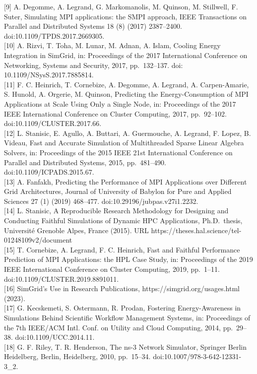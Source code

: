 \documentclass[
]{article}
\begin{document}
{[}9{]} A. Degomme, A. Legrand, G. Markomanolis, M. Quinson, M.
Stillwell, F. Suter, Simulating MPI applications: the SMPI approach,
IEEE Transactions on Parallel and Distributed Systems 18 (8) (2017)
2387--2400. doi:10.1109/TPDS.2017.2669305.\\
{[}10{]} A. Rizvi, T. Toha, M. Lunar, M. Adnan, A. Islam, Cooling Energy
Integration in SimGrid, in: Proceedings of the 2017 International
Conference on Networking, Systems and Security, 2017, pp.~132--137. doi:
10.1109/NSysS.2017.7885814.\\
{[}11{]} F. C. Heinrich, T. Cornebize, A. Degomme, A. Legrand, A.
Carpen-Amarie, S. Hunold, A. Orgerie, M. Quinson, Predicting the
Energy-Consumption of MPI Applications at Scale Using Only a Single
Node, in: Proceedings of the 2017 IEEE International Conference on
Cluster Computing, 2017, pp.~92--102. doi:10.1109/CLUSTER.2017.66.\\
{[}12{]} L. Stanisic, E. Agullo, A. Buttari, A. Guermouche, A. Legrand,
F. Lopez, B. Videau, Fast and Accurate Simulation of Multithreaded
Sparse Linear Algebra Solvers, in: Proceedings of the 2015 IEEE 21st
International Conference on Parallel and Distributed Systems, 2015,
pp.~481--490. doi:10.1109/ICPADS.2015.67.\\
{[}13{]} A. Fanfakh, Predicting the Performance of MPI Applications over
Different Grid Architectures, Journal of University of Babylon for Pure
and Applied Sciences 27 (1) (2019) 468--477.
doi:10.29196/jubpas.v27i1.2232.\\
{[}14{]} L. Stanisic, A Reproducible Research Methodology for Designing
and Conducting Faithful Simulations of Dynamic HPC Applications,
Ph.D.~thesis, Université Grenoble Alpes, France (2015). URL
https://theses.hal.science/tel-01248109v2/document\\
{[}15{]} T. Cornebize, A. Legrand, F. C. Heinrich, Fast and Faithful
Performance Prediction of MPI Applications: the HPL Case Study, in:
Proceedings of the 2019 IEEE International Conference on Cluster
Computing, 2019, pp.~1--11. doi:10.1109/CLUSTER.2019.8891011.\\
{[}16{]} SimGrid's Use in Research Publications,
https://simgrid.org/usages.html (2023).\\
{[}17{]} G. Kecskemeti, S. Ostermann, R. Prodan, Fostering
Energy-Awareness in Simulations Behind Scientific Workflow Management
Systems, in: Proceedings of the 7th IEEE/ACM Intl. Conf. on Utility and
Cloud Computing, 2014, pp.~29--38. doi:10.1109/UCC.2014.11.\\
{[}18{]} G. F. Riley, T. R. Henderson, The ns-3 Network Simulator,
Springer Berlin Heidelberg, Berlin, Heidelberg, 2010, pp.~15--34.
doi:10.1007/978-3-642-12331-3\_2.
\end{document}
